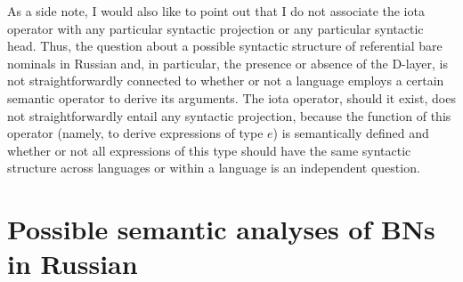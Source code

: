 \documentclass[output=paper,colorlinks,citecolor=brown]{langscibook}
\begin{document}

 

As a side note, I would also like to point out that I do not associate the iota operator with any particular syntactic projection or any particular syntactic head. Thus, the question about a possible syntactic structure of referential bare nominals in Russian and, in particular, the presence or absence of the D-layer, is not straightforwardly connected to whether or not a language employs a certain semantic operator to derive its arguments. The iota operator, should it exist, does not straightforwardly entail any syntactic projection, because the function of this operator (namely, to derive expressions of type ${e}$) is semantically defined and whether or not all expressions of this type should have the same syntactic structure across languages or within a language is an independent question.


\section{Possible semantic analyses of BNs in Russian} \label{analysesRU}
\end{document}
